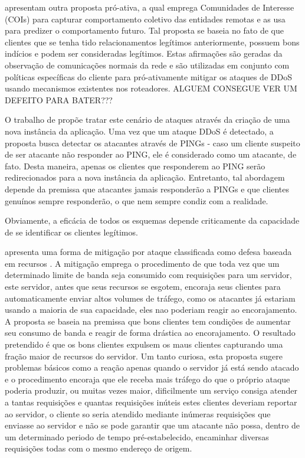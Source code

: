 \documentclass[a4paper, 12pt]{article}
\begin{document}
\cite{Verkaik:2006:PCD:1162666.1162673} apresentam outra proposta pró-ativa, a qual emprega Comunidades de Interesse (COIs) para capturar comportamento coletivo das entidades remotas e as usa para predizer o comportamento futuro. Tal proposta se baseia no fato de que clientes que se tenha tido relacionamentos legítimos anteriormente, possuem bons indícios e podem ser consideradas legítimos. Estas afirmações são geradas da observação de comunicações normais da rede e são utilizadas em conjunto com políticas específicas do cliente para pró-ativamente mitigar os ataques de DDoS usando mecanismos existentes nos roteadores. ALGUEM CONSEGUE VER UM DEFEITO PARA BATER??? 


O trabalho de \cite{Bakshi:10} propõe tratar este cenário de ataques através da criação de uma nova instância da aplicação. Uma vez que um ataque DDoS é detectado, a proposta busca detectar os atacantes através de PINGs - caso um cliente suspeito de ser atacante não responder ao PING, ele é considerado como um atacante, de fato. Desta maneira, apenas os clientes que responderem ao PING serão 
redirecionados para a nova instância da aplicação. Entretanto, tal abordagem depende da premissa que atacantes jamais responderão a PINGs e que clientes genuínos sempre responderão, o que nem sempre condiz com a realidade.

Obviamente, a eficácia de todos os esquemas depende criticamente da capacidade de se identificar os clientes legítimos. 



\cite{Walfish:2010:DDO:1731060.1731063} apresenta uma forma de mitigação por ataque classificada como defesa baseada em recursos \cite{Dwork:1992:PVP:646757.705669}. A mitigação emprega o procedimento de que toda vez que um determinado limite de banda seja consumido com requisições para um servidor, este servidor, antes que seus recursos se esgotem, encoraja seus clientes para automaticamente enviar altos volumes de tráfego, como os atacantes já estariam usando a maioria de sua capacidade, eles nao poderiam reagir ao encorajamento. A proposta se baseia na premissa que bons clientes tem condições de aumentar seu consumo de banda e reagir de forma drástica ao encorajamento. O resultado pretendido é que os bons clientes expulsem os maus clientes capturando uma fração maior de recursos do servidor. Um tanto curiosa, esta proposta sugere problemas básicos como a reação apenas quando o servidor já está sendo atacado e o procedimento encoraja que ele receba mais tráfego do que o próprio ataque poderia produzir, ou muitas vezes maior, dificilmente um serviço consiga atender a tantas requisições e quantas requisições inúteis estes clientes deveriam reportar ao servidor, o cliente so seria atendido mediante inúmeras requisições que enviasse ao servidor e não se pode garantir que um atacante não possa, dentro de um determinado periodo de tempo pré-estabelecido, encaminhar diversas requisições todas com o mesmo endereço de origem.
\end{document}
